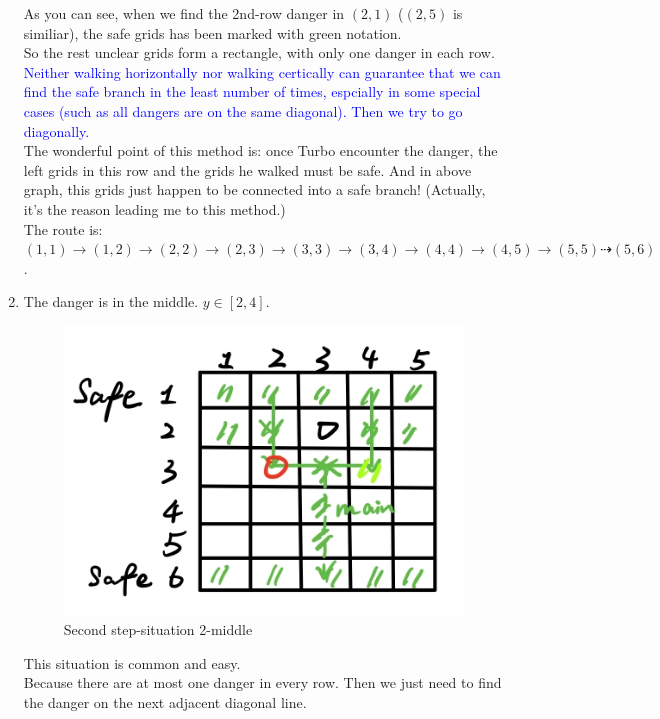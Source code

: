 \documentclass{Math_Note}
\begin{document}
\begin{sol}
\begin{enumerate}
    As you can see, when we find the 2nd-row danger in $(2,1)$ ($(2,5)$ is similiar), the safe grids has been marked with green notation. \\
    So the rest unclear grids form a rectangle, with only one danger in each row. \\
    \marginpar{\textcolor{green}{method}}
    \textcolor{blue}{
    Neither walking horizontally nor walking certically can guarantee that we can find the safe branch in the least number of times, espcially 
    in some special cases (such as all dangers are on the same diagonal). Then we try to go diagonally. \\
    }
    The wonderful point of this method is: once Turbo encounter the danger, the left grids in this row and the grids he walked must be safe. And in 
    above graph, this grids just happen to be connected into a safe branch! (Actually, it's the reason leading me to this method.) \\
    The route is: $(1,1)\rightarrow(1,2)\rightarrow(2,2)\rightarrow(2,3)\rightarrow(3,3)\rightarrow(3,4)\rightarrow(4,4)\rightarrow(4,5)\rightarrow(5,5)\dashrightarrow(5,6)$. 
    \item The danger is in the middle. $y\in\left[2,4\right]$.
    \begin{figure}[H]
        \centering
        \includegraphics[scale=0.25]{"./Figures/Q5F3_2.png"}
        \caption{Second step-situation 2-middle}
    \end{figure}
    This situation is common and easy. \\
    Because there are at most one danger in every row. Then we just need to find the danger on the next adjacent diagonal line. \\

\end{enumerate}
\end{sol}
\end{document}
